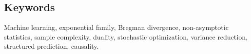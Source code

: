 \documentclass[12pt]{report} %
\numberwithin{equation}{chapter}
\numberwithin{table}{chapter}
\numberwithin{figure}{chapter}
\begin{document}
\subsection*{Keywords}
Machine learning, exponential family, Bregman divergence, non-asymptotic statistics, sample complexity, duality, stochastic optimization, variance reduction, structured prediction, causality.



\cleardoublepage
{}  %
\tableofcontents
\cleardoublepage
{}  %
\listoftables
\cleardoublepage
{}
\listoffigures

\end{document}
